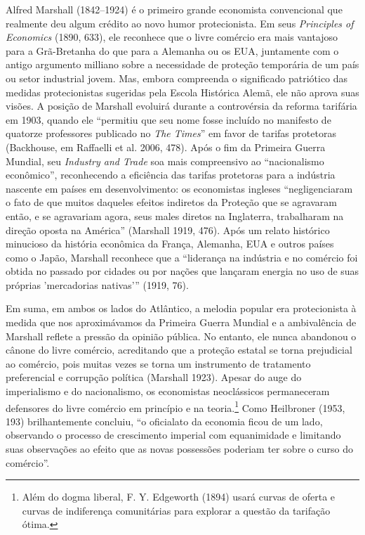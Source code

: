 \documentclass[12pt]{article}
\begin{document}
Alfred Marshall (1842–1924) é o primeiro grande economista convencional que realmente deu algum crédito ao novo humor protecionista. Em seus \textit{Principles of Economics} (1890, 633), ele reconhece que o livre comércio era mais vantajoso para a Grã-Bretanha do que para a Alemanha ou os EUA, juntamente com o antigo argumento milliano sobre a necessidade de proteção temporária de um país ou setor industrial jovem. Mas, embora compreenda o significado patriótico das medidas protecionistas sugeridas pela Escola Histórica Alemã, ele não aprova suas visões. A posição de Marshall evoluirá durante a controvérsia da reforma tarifária em 1903, quando ele “permitiu que seu nome fosse incluído no manifesto de quatorze professores publicado no \textit{The Times}” em favor de tarifas protetoras (Backhouse, em Raffaelli et al. 2006, 478). Após o fim da Primeira Guerra Mundial, seu \textit{Industry and Trade} soa mais compreensivo ao “nacionalismo econômico”, reconhecendo a eficiência das tarifas protetoras para a indústria nascente em países em desenvolvimento: os economistas ingleses “negligenciaram o fato de que muitos daqueles efeitos indiretos da Proteção que se agravaram então, e se agravariam agora, seus males diretos na Inglaterra, trabalharam na direção oposta na América” (Marshall 1919, 476). Após um relato histórico minucioso da história econômica da França, Alemanha, EUA e outros países como o Japão, Marshall reconhece que a “liderança na indústria e no comércio foi obtida no passado por cidades ou por nações que lançaram energia no uso de suas próprias 'mercadorias nativas'” (1919, 76).

Em suma, em ambos os lados do Atlântico, a melodia popular era protecionista à medida que nos aproximávamos da Primeira Guerra Mundial e a ambivalência de Marshall reflete a pressão da opinião pública. No entanto, ele nunca abandonou o cânone do livre comércio, acreditando que a proteção estatal se torna prejudicial ao comércio, pois muitas vezes se torna um instrumento de tratamento preferencial e corrupção política (Marshall 1923). Apesar do auge do imperialismo e do nacionalismo, os economistas neoclássicos permaneceram defensores do livre comércio em princípio e na teoria.\footnote{Além do dogma liberal, F. Y. Edgeworth (1894) usará curvas de oferta e curvas de indiferença comunitárias para explorar a questão da tarifação ótima.} Como Heilbroner (1953, 193) brilhantemente concluiu, “o oficialato da economia ficou de um lado, observando o processo de crescimento imperial com equanimidade e limitando suas observações ao efeito que as novas possessões poderiam ter sobre o curso do comércio”.
\end{document}

